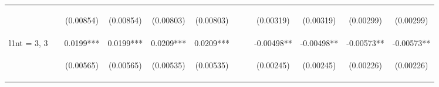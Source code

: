 \documentclass[]{article}
\begin{document}
\begin{center}
\begin{tabular}{lccccccccccc}
\vspace{4pt} & \begin{footnotesize}\end{footnotesize} & \begin{footnotesize}(0.00854)\end{footnotesize} & \begin{footnotesize}(0.00854)\end{footnotesize} & \begin{footnotesize}(0.00803)\end{footnotesize} & \begin{footnotesize}(0.00803)\end{footnotesize} & \begin{footnotesize}\end{footnotesize} & \begin{footnotesize}\end{footnotesize} & \begin{footnotesize}(0.00319)\end{footnotesize} & \begin{footnotesize}(0.00319)\end{footnotesize} & \begin{footnotesize}(0.00299)\end{footnotesize} & \begin{footnotesize}(0.00299)\end{footnotesize} \\
l1nt = 3, 3 &  & 0.0199*** & 0.0199*** & 0.0209*** & 0.0209*** &  &  & -0.00498** & -0.00498** & -0.00573** & -0.00573** \\
\vspace{4pt} & \begin{footnotesize}\end{footnotesize} & \begin{footnotesize}(0.00565)\end{footnotesize} & \begin{footnotesize}(0.00565)\end{footnotesize} & \begin{footnotesize}(0.00535)\end{footnotesize} & \begin{footnotesize}(0.00535)\end{footnotesize} & \begin{footnotesize}\end{footnotesize} & \begin{footnotesize}\end{footnotesize} & \begin{footnotesize}(0.00245)\end{footnotesize} & \begin{footnotesize}(0.00245)\end{footnotesize} & \begin{footnotesize}(0.00226)\end{footnotesize} & \begin{footnotesize}(0.00226)\end{footnotesize} \\

\end{tabular}
\end{center}
\end{document}
